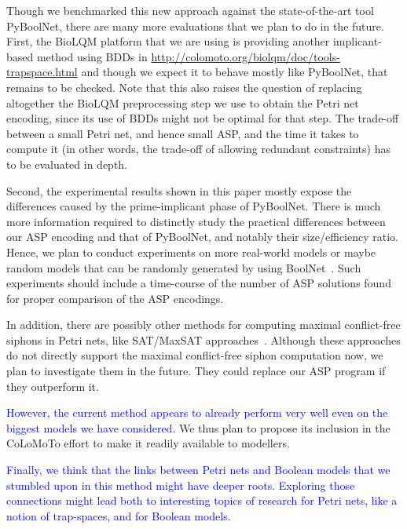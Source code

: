 \documentclass[runningheads]{llncs}
\newcommand{\revise}[1]{\textcolor{blue}{#1}}
\begin{document}
Though we benchmarked this new approach against the state-of-the-art tool PyBoolNet, there are many more evaluations that we plan to do in the future.
First, the BioLQM platform that we are using is providing another implicant-based method using BDDs in \url{http://colomoto.org/biolqm/doc/tools-trapspace.html} and though we expect it to behave mostly like PyBoolNet, that remains to be checked.
Note that this also raises the question of replacing altogether the BioLQM preprocessing step we use to obtain the Petri net encoding, since its use of BDDs might not be optimal for that step.
The trade-off between a small Petri net, and hence small ASP, and the time it takes to compute it (in other words, the trade-off of allowing redundant constraints) has to be evaluated in depth.

Second, the experimental results shown in this paper mostly expose the differences caused by the prime-implicant phase of PyBoolNet. There is much more information required to distinctly study the practical differences between our ASP encoding and that of PyBoolNet, and notably their size/efficiency ratio.
Hence, we plan to conduct experiments on more real-world models or maybe random models that can be randomly generated by using BoolNet~\cite{mussel2010boolnet}.
Such experiments should include a time-course of the number of ASP solutions found for proper comparison of the ASP encodings.

In addition, there are possibly other methods for computing maximal conflict-free siphons in Petri nets, like SAT/MaxSAT approaches~\cite{nabli2016enumerating}. Although these approaches do not directly support the maximal conflict-free siphon computation now, we plan to investigate them in the future. They could replace our ASP program if they outperform it.

\revise{However, the current method appears to already perform very well even on the biggest models we have considered.}
We thus plan to propose its inclusion in the CoLoMoTo effort to make it readily available to modellers.

\revise{Finally, we think that the links between Petri nets and Boolean models that we stumbled upon in this method might have deeper roots. Exploring those connections might lead both to interesting topics of research for Petri nets, like a notion of trap-spaces, and for Boolean models.}




\end{document}
